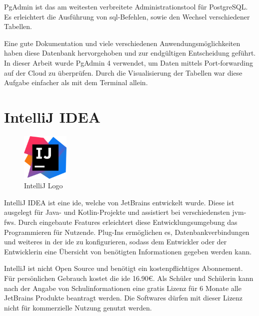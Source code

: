 PgAdmin ist das am weitesten verbreitete Administrationstool für PostgreSQL. 
\cite{PgAdminAbout}
Es erleichtert die Ausführung von \gls{sql}-Befehlen, sowie den Wechsel verschiedener Tabellen.

Eine gute Dokumentation und viele verschiedenen Anwendungsmöglichkeiten haben diese Datenbank hervorgehoben und zur endgültigen Entscheidung geführt. 
In dieser Arbeit wurde PgAdmin 4 verwendet, um Daten mittels Port-forwarding auf der Cloud zu überprüfen. 
Durch die Visualisierung der Tabellen war diese Aufgabe einfacher als mit dem Terminal allein. 

\section{IntelliJ IDEA}
\begin{figure}
  \begin{center}
      \includegraphics[width=0.2\textwidth]{pics/logos/intellij.png}
      \caption{IntelliJ Logo}
  \end{center}
\end{figure}
IntelliJ IDEA ist eine \gls{ide}, welche von JetBrains entwickelt wurde. 
Diese ist ausgelegt für Java- und Kotlin-Projekte und assistiert bei verschiedensten \gls{jvm}-\glspl{fw}. 
Durch eingebaute Features erleichtert diese Entwicklungsumgebung das Programmieren für Nutzende. 
Plug-Ins ermöglichen es, Datenbankverbindungen und weiteres in der \gls{ide} zu konfigurieren, sodass dem Entwickler oder der Entwicklerin eine Übersicht von benötigten Informationen gegeben werden kann.
\cite{IntelliJIDEA}

IntelliJ ist nicht Open Source und benötigt ein kostenpflichtiges Abonnement. 
Für persönlichen Gebrauch kostet die \gls{ide} 16.90€.
Als Schüler und Schülerin kann nach der Angabe von Schulinformationen eine gratis Lizenz für 6 Monate alle JetBrains Produkte beantragt werden. 
Die Softwares dürfen mit dieser Lizenz nicht für kommerzielle Nutzung genutzt werden.
\cite{IntelliJIDEAPricing}

